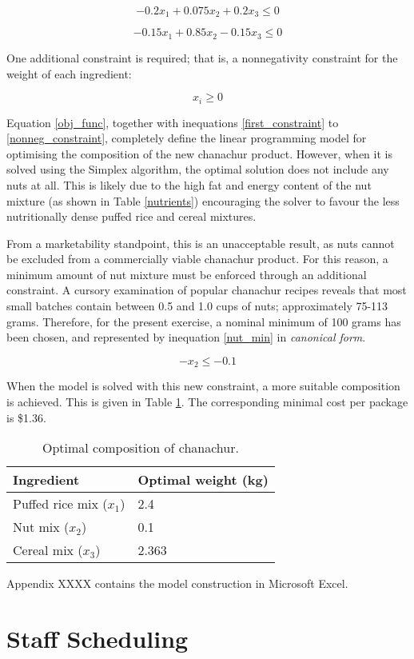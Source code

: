\documentclass[11pt, a4paper]{article}
\begin{document}
    \begin{equation}
        -0.2x_1 + 0.075x_2 + 0.2x_3 \leq 0
    \end{equation}

    \begin{equation}
        -0.15x_1 + 0.85x_2 - 0.15x_3 \leq 0
        \label{last_constraint}
    \end{equation}

    One additional constraint is required; that is, a nonnegativity constraint for the weight of each ingredient:

    \begin{equation}
        x_i \geq 0
        \label{nonneg_constraint}
    \end{equation}

    Equation \ref{obj_func}, together with inequations \ref{first_constraint} to \ref{nonneg_constraint}, completely define the linear programming model for optimising the composition of the new chanachur product. However, when it is solved using the Simplex algorithm, the optimal solution does not include any nuts at all. This is likely due to the high fat and energy content of the nut mixture (as shown in Table \ref{nutrients}) encouraging the solver to favour the less nutritionally dense puffed rice and cereal mixtures.

    From a marketability standpoint, this is an unacceptable result, as nuts cannot be excluded from a commercially viable chanachur product. For this reason, a minimum amount of nut mixture must be enforced through an additional constraint. A cursory examination of popular chanachur recipes reveals that most small batches contain between 0.5 and 1.0 cups of nuts; approximately 75-113 grams. Therefore, for the present exercise, a nominal minimum of 100 grams has been chosen, and represented by inequation \ref{nut_min} in \textit{canonical form}.

    \begin{equation}
        -x_2 \leq -0.1
        \label{nut_min}
    \end{equation}

    When the model is solved with this new constraint, a more suitable composition is achieved. This is given in Table \ref{results}. The corresponding minimal cost per package is \$1.36.

    \begin{table}[!ht]
        \centering
        \caption{Optimal composition of chanachur.}
        \begin{tabular}{|l|l|}
            \hline
            Ingredient                  & Optimal weight (kg)   \\ \hline
            Puffed rice mix ($x_1$)     & 2.4                   \\ \hline
            Nut mix ($x_2$)             & 0.1                   \\ \hline
            Cereal mix ($x_3$)          & 2.363                 \\ \hline          
        \end{tabular}
        \label{results}
    \end{table}

    Appendix XXXX contains the model construction in Microsoft Excel.

    \newpage

    \section{Staff Scheduling}
\end{document}
